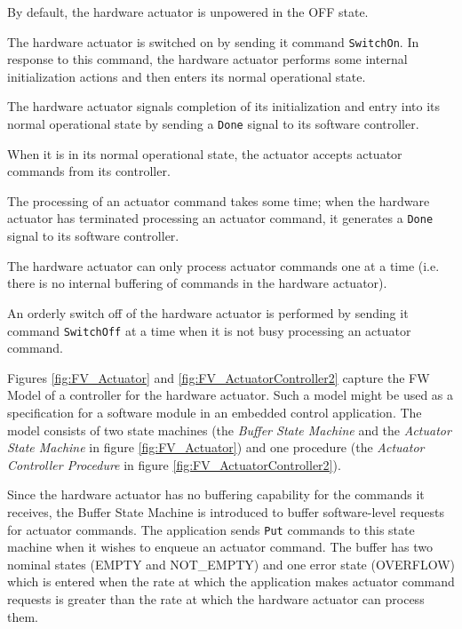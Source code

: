 \documentclass[definition]{../fwprofile}
\begin{document}
\begin{fw_enumerate}
\item By default, the hardware actuator is unpowered in the OFF state.
\item The hardware actuator is switched on by sending it command \texttt{SwitchOn}. In response to this command, the hardware actuator performs some internal initialization actions and then enters its normal operational state. 
\item The hardware actuator signals completion of its initialization and entry into its normal operational state by sending a \texttt{Done} signal to its software controller.
\item When it is in its normal operational state, the actuator accepts actuator commands from its controller.
\item The processing of an actuator command takes some time; when the hardware actuator has terminated processing an actuator command, it generates a \texttt{Done} signal to its software controller.
\item The hardware actuator can only process actuator commands one at a time (i.e. there is no internal buffering of commands in the hardware actuator).
\item An orderly switch off of the hardware actuator is performed by sending it command \texttt{SwitchOff} at a time when it is not busy processing an actuator command.
\end{fw_enumerate}

Figures \ref{fig:FV_Actuator} and \ref{fig:FV_ActuatorController2} capture the FW Model of a controller for the hardware actuator. Such a model might be used as a specification for a software module in an embedded control application. The model consists of two state machines (the \textit{Buffer State Machine} and the \textit{Actuator State Machine} in figure \ref{fig:FV_Actuator}) and one procedure (the \textit{Actuator Controller Procedure} in figure \ref{fig:FV_ActuatorController2}).

Since the hardware actuator has no buffering capability for the commands it receives, the Buffer State Machine is introduced to buffer software-level requests for actuator commands. The application sends \texttt{Put} commands to this state machine when it wishes to enqueue an actuator command. The buffer has two nominal states (EMPTY and NOT\_EMPTY) and one error state (OVERFLOW) which is entered when the rate at which the application makes actuator command requests is greater than the rate at which the hardware actuator can process them.
\end{document}
